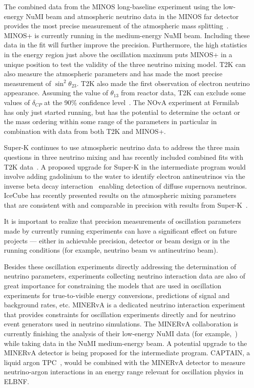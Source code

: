 The combined data from the MINOS long-baseline experiment using the
low-energy NuMI beam and atmospheric neutrino data in the MINOS far
detector provides the most precise measurement of the atmospheric mass
splitting~\cite{Adamson:2014vgd}.  MINOS+ is currently running in the
medium-energy NuMI beam.  Including these data in the fit will further
improve the precision.  Furthermore, the high statistics in the energy
region just above the oscillation maximum puts MINOS+ in a unique
position to test the validity of the three neutrino mixing model. T2K
can also measure the atmospheric parameters and has made the most
precise measurement of $\sin^2\theta_{23}$.  T2K also made the first
observation of electron neutrino appearance.  Assuming the value of
$\theta_{13}$ from reactor data, T2K can exclude some values of
$\delta_{CP}$ at the 90\% confidence level~\cite{Abe:2015awa}.  The
NOvA experiment at Fermilab has only just started running, but has the
potential to determine the octant or the mass ordering within some
range of the parameters in particular in combination with data from
both T2K and MINOS+.

Super-K continues to use atmospheric neutrino data to address
the three main questions in three neutrino mixing and has recently
included combined fits with T2K data~\cite{Wendell:2014dka}.  A
proposed upgrade for Super-K in the intermediate program would involve
adding gadolinium to the water to identify electron antineutrinos via
the inverse beta decay interaction~\cite{Beacom:2003nk} enabling
detection of diffuse supernova neutrinos. IceCube has recently
presented results on the atmospheric mixing parameters that are
consistent with and comparable in precision with results from
Super-K~\cite{Aartsen:2014yll}.

It is important to realize that precision measurements of oscillation
parameters made by currently running experiments can have a
significant effect on future projects --- either in achievable
precision, detector or beam design or in the running conditions (for
example, neutrino beam vs antineutrino beam).

Besides these oscillation experiments directly addressing the
determination of neutrino parameters, experiments collecting neutrino
interaction data are also of great importance for constraining the models
that are used in oscillation experiments for true-to-visible energy
conversions, predictions of signal and background rates, etc.  MINERvA
is a dedicated neutrino interaction experiment that provides
constraints for oscillation experiments directly and for neutrino
event generators used in neutrino simulations.  The MINERvA
collaboration is currently finishing the analysis of their low-energy
NuMI data (for example,~\cite{Walton:2014esl}) while taking data in
the NuMI medium-energy beam.  A potential upgrade to the MINERvA
detector is being proposed for the intermediate program.  CAPTAIN, a
liquid argon TPC~\cite{Berns:2013usa}, would be combined with the
MINERvA detector to measure neutrino-argon interactions in an energy
range relevant for oscillation physics in ELBNF.

